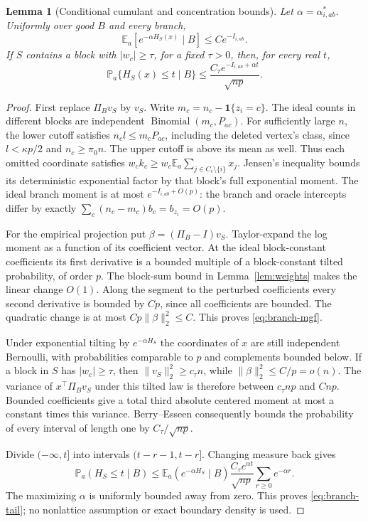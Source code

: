 \documentclass[11pt]{article}
\newtheorem{lemma}[theorem]{Lemma}
\newcommand{\E}{\mathbb E}
\newcommand{\Prb}{\mathbb P}
\newcommand{\one}{\mathbf 1}
\begin{document}
\begin{lemma}[Conditional cumulant and concentration bounds]\label{lem:conditional}
Let $\alpha=\alpha^*_{i,ab}$. Uniformly over good $B$ and every branch,
\begin{equation}\label{eq:branch-mgf}
 \E_a[e^{-\alpha H_S(x)}\mid B]\le C e^{-I_{i,ab}}.
\end{equation}
If $S$ contains a block with $|w_c|\ge\tau$, for a fixed $\tau>0$, then, for every real $t$,
\begin{equation}\label{eq:branch-tail}
 \Prb_a\{H_S(x)\le t\mid B\}
 \le\frac{C_\tau e^{-I_{i,ab}+\alpha t}}{\sqrt{np}}.
\end{equation}
\end{lemma}
\begin{proof}
First replace $\Pi_Bv_S$ by $v_S$. Write $m_c=n_c-\one\{z_i=c\}$. The ideal counts in different blocks are independent $\operatorname{Binomial}(m_c,P_{ac})$. For sufficiently large $n$, the lower cutoff satisfies $n_cl\le m_cP_{ac}$, including the deleted vertex's class, since $l<\kappa p/2$ and $n_c\ge\pi_0n$. The upper cutoff is above its mean as well. Thus each omitted coordinate satisfies $w_ck_c\ge w_c\E_a\sum_{j\in C_c\setminus\{i\}}x_j$. Jensen's inequality bounds its deterministic exponential factor by that block's full exponential moment. The ideal branch moment is at most $e^{-I_{i,ab}+O(p)}$: the branch and oracle intercepts differ by exactly $\sum_c(n_c-m_c)b_c=b_{z_i}=O(p)$.

For the empirical projection put $\beta=(\Pi_B-I)v_S$. Taylor-expand the log moment as a function of its coefficient vector. At the ideal block-constant coefficients its first derivative is a bounded multiple of a block-constant tilted probability, of order $p$. The block-sum bound in Lemma~\ref{lem:weights} makes the linear change $O(1)$. Along the segment to the perturbed coefficients every second derivative is bounded by $Cp$, since all coefficients are bounded. The quadratic change is at most $Cp\|\beta\|_2^2\le C$. This proves \eqref{eq:branch-mgf}.

Under exponential tilting by $e^{-\alpha H_S}$ the coordinates of $x$ are still independent Bernoulli, with probabilities comparable to $p$ and complements bounded below. If a block in $S$ has $|w_c|\ge\tau$, then $\|v_S\|_2^2\ge c_\tau n$, while $\|\beta\|_2^2\le C/p=o(n)$. The variance of $x^\top\Pi_Bv_S$ under this tilted law is therefore between $c_\tau np$ and $Cnp$. Bounded coefficients give a total third absolute centered moment at most a constant times this variance. Berry--Esseen consequently bounds the probability of every interval of length one by $C_\tau/\sqrt{np}$.

Divide $(-\infty,t]$ into intervals $(t-r-1,t-r]$. Changing measure back gives
\[
 \Prb_a(H_S\le t\mid B)
 \le \E_a(e^{-\alpha H_S}\mid B)
       \frac{C_\tau e^{\alpha t}}{\sqrt{np}}
       \sum_{r\ge0}e^{-\alpha r}.
\]
The maximizing $\alpha$ is uniformly bounded away from zero. This proves \eqref{eq:branch-tail}; no nonlattice assumption or exact boundary density is used.
\end{proof}
\end{document}
